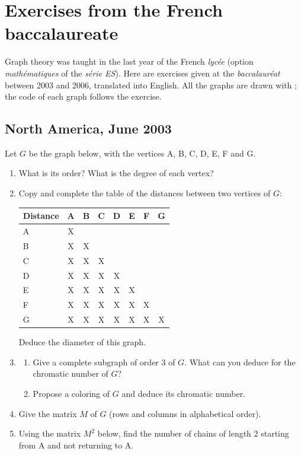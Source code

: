 \section{Exercises from the French baccalaureate}
Graph theory was taught in the last year of the French \emph{lycée}
(option \emph{mathématiques} of the \emph{série ES}). Here are exercises given
at the \emph{baccalauréat} between 2003 and 2006, translated into English. All
the graphs are drawn with ; the code of each graph follows
the exercise.

\subsection{North America, June 2003}\label{an03}
Let $G$ be the graph below, with the vertices A, B, C, D, E, F and G.

\begin{enumerate}
\item What is its order? What is the degree of each vertex?
\item Copy and complete the table of the distances between two vertices of
      $G$:

\medskip
\begin{center}
\begin{tabular}{|l|c|c|c|c|c|c|c|}\hline
Distance & A & B & C & D & E & F & G \\ \hline
A        & X &   &   &   &   &   &   \\ \hline
B        & X & X &   &   &   &   &   \\ \hline
C        & X & X & X &   &   &   &   \\ \hline
D        & X & X & X & X &   &   &   \\ \hline
E        & X & X & X & X & X &   &   \\ \hline
F        & X & X & X & X & X & X &   \\ \hline
G        & X & X & X & X & X & X & X \\ \hline
\end{tabular}
\end{center}

\medskip
Deduce the diameter of this graph.
\item
   \begin{enumerate}
   \item Give a complete subgraph of order 3 of $G$. What can you deduce for
         the chromatic number of $G$?
   \item Propose a coloring of $G$ and deduce its chromatic number.
   \end{enumerate}
\item Give the matrix $M$ of $G$ (rows and columns in alphabetical order).
\item Using the matrix $M^2$ below, find the number of chains of length 2
      starting from A and not returning to A.
\end{enumerate}

